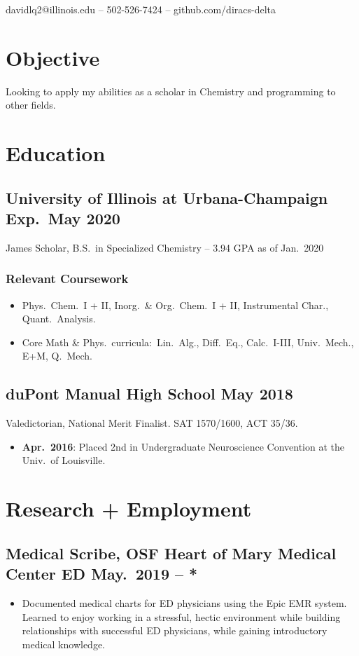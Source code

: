 \documentclass{article}
\makeatletter
\renewcommand{\maketitle}
{
	\begin{center}
	{\huge\bfseries\theauthor}

	\vspace{0.5em}
	davidlq2@illinois.edu -- 502-526-7424 -- github.com/diracs-delta
	\end{center}
}
\makeatother
\begin{document}
\author{David Qiu}
\maketitle

\section{Objective}
Looking to apply my abilities as a scholar in Chemistry and programming to other
fields.

\section{Education}
\subsection{University of Illinois at Urbana-Champaign \hfill Exp.\ May 2020}
James Scholar, B.S.\ in Specialized Chemistry -- 3.94 GPA as of Jan.\ 2020
\subsubsection{Relevant Coursework}
\begin{itemize}[noitemsep,nolistsep]
	\item Phys.\ Chem.\ I + II, Inorg.\ \& Org.\ Chem.\ I + II, Instrumental
	Char., Quant.\ Analysis.

	\item Core Math \& Phys.\ curricula:\ Lin.\ Alg., Diff.\ Eq., Calc.\
	I-III, Univ.\ Mech., E+M, Q.\ Mech.
\end{itemize}
\subsection{duPont Manual High School \hfill May 2018}
Valedictorian, National Merit Finalist. SAT 1570/1600, ACT 35/36.
\begin{itemize}[noitemsep,nolistsep]
	\item\textbf{Apr.\ 2016}: Placed 2nd in Undergraduate Neuroscience
	Convention at the Univ.\ of Louisville.
\end{itemize}

\section{Research + Employment}
\subsection{Medical Scribe, OSF Heart of Mary Medical Center ED
	    \hfill May.\ 2019 -- *}
\begin{itemize}[noitemsep,nolistsep]
	\item Documented medical charts for ED physicians using the Epic EMR
	system. Learned to enjoy working in a stressful, hectic environment
	while building relationships with successful ED physicians, while
	gaining introductory medical knowledge.
\end{itemize}
\end{document}

